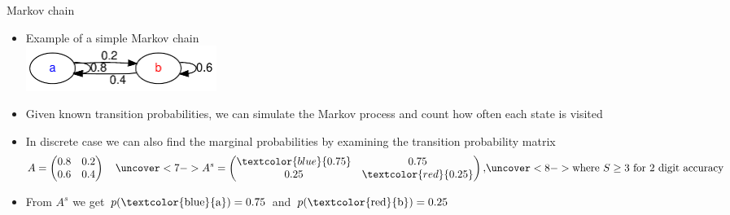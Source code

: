 \documentclass[finnish,english,t]{beamer}
\begin{document}
\begin{frame}{Markov chain}

  \vspace{-0.5\baselineskip}
  \begin{itemize}
  \item Example of a simple Markov chain\\
  \includegraphics[width=6.2cm]{Markov_graphviz.pdf}
  \item<2-> Given known transition probabilities, we can simulate
    the Markov process and count how often each state is visited\\
  \item<6-> In discrete case we can also find the marginal probabilities by examining the transition probability matrix
    \begin{align*}
      A = \begin{pmatrix}
        0.8 & 0.2 \\
        0.6 & 0.4
      \end{pmatrix} \quad
      \uncover<7->{
      A^s = \begin{pmatrix}
        \textcolor{blue}{0.75} & 0.75 \\
        0.25 & \textcolor{red}{0.25}
      \end{pmatrix},}\uncover<8->{ \text{where } S\geq 3 \text{ for 2 digit accuracy}}
    \end{align*}
  \item<9-> From $A^s$ we get $p(\text{\textcolor{blue}{a}})=0.75$ and $p(\text{\textcolor{red}{b}})=0.25$
  \end{itemize}

  
\end{frame}  
\end{document}
